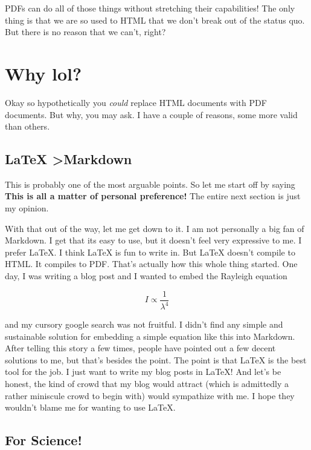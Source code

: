 \documentclass[12pt]{article}
\begin{document}
  PDFs can do all of those things without stretching their capabilities! The only thing is that we are so used to HTML that we don't break out of the status quo. But there is no reason that we can't, right? 

  \section{Why lol?}

  Okay so hypothetically you \textit{could} replace HTML documents with PDF documents. But why, you may ask. I have a couple of reasons, some more valid than others. 

  \subsection{LaTeX \textgreater  Markdown}

  This is probably one of the most arguable points. So let me start off by saying \textbf{This is all a matter of personal preference!} The entire next section is just my opinion. 

  With that out of the way, let me get down to it. I am not personally a big fan of Markdown. I get that its easy to use, but it doesn't feel very expressive to me. I prefer LaTeX. I think LaTeX is fun to write in. But LaTeX doesn't compile to HTML. It compiles to PDF. That's actually how this whole thing started. One day, I was writing a blog post and I wanted to embed the Rayleigh equation 

  \begin{displaymath}
  I \propto \frac{1}{\lambda^4}
  \end{displaymath}

  and my cursory google search was not fruitful. I didn't find any simple and sustainable solution for embedding a simple equation like this into Markdown. After telling this story a few times, people have pointed out a few decent solutions to me, but that's besides the point. The point is that LaTeX is the best tool for the job. I just want to write my blog posts in LaTeX! And let's be honest, the kind of crowd that my blog would attract (which is admittedly a rather miniscule crowd to begin with) would sympathize with me. I hope they wouldn't blame me for wanting to use LaTeX. 


  \subsection{For Science!}
\end{document}
